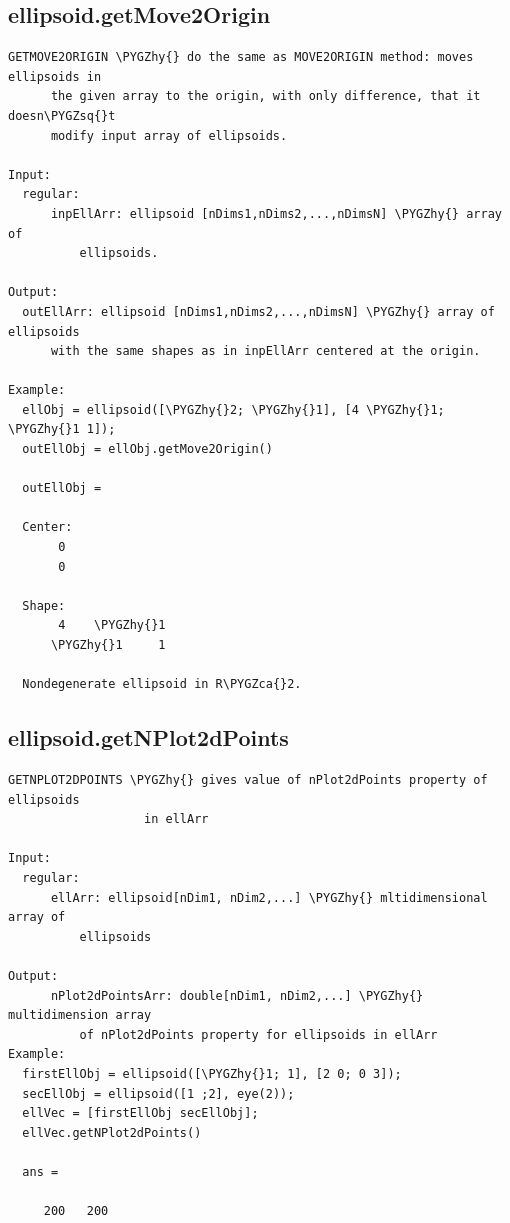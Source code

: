 \documentclass[letterpaper,10pt,english]{sphinxmanual}
\def\PYGZca{\char`\^}
\def\PYGZhy{\char`\-}
\def\PYGZsq{\char`\'}
\begin{document}
\subsection{ellipsoid.getMove2Origin}
\label{chap_functions:ellipsoid-getmove2origin}
\begin{Verbatim}[commandchars=\\\{\}]
GETMOVE2ORIGIN \PYGZhy{} do the same as MOVE2ORIGIN method: moves ellipsoids in
      the given array to the origin, with only difference, that it doesn\PYGZsq{}t
      modify input array of ellipsoids.

Input:
  regular:
      inpEllArr: ellipsoid [nDims1,nDims2,...,nDimsN] \PYGZhy{} array of
          ellipsoids.

Output:
  outEllArr: ellipsoid [nDims1,nDims2,...,nDimsN] \PYGZhy{} array of ellipsoids
      with the same shapes as in inpEllArr centered at the origin.

Example:
  ellObj = ellipsoid([\PYGZhy{}2; \PYGZhy{}1], [4 \PYGZhy{}1; \PYGZhy{}1 1]);
  outEllObj = ellObj.getMove2Origin()

  outEllObj =

  Center:
       0
       0

  Shape:
       4    \PYGZhy{}1
      \PYGZhy{}1     1

  Nondegenerate ellipsoid in R\PYGZca{}2.
\end{Verbatim}


\subsection{ellipsoid.getNPlot2dPoints}
\label{chap_functions:ellipsoid-getnplot2dpoints}
\begin{Verbatim}[commandchars=\\\{\}]
GETNPLOT2DPOINTS \PYGZhy{} gives value of nPlot2dPoints property of ellipsoids
                   in ellArr

Input:
  regular:
      ellArr: ellipsoid[nDim1, nDim2,...] \PYGZhy{} mltidimensional array of
          ellipsoids

Output:
      nPlot2dPointsArr: double[nDim1, nDim2,...] \PYGZhy{} multidimension array
          of nPlot2dPoints property for ellipsoids in ellArr
Example:
  firstEllObj = ellipsoid([\PYGZhy{}1; 1], [2 0; 0 3]);
  secEllObj = ellipsoid([1 ;2], eye(2));
  ellVec = [firstEllObj secEllObj];
  ellVec.getNPlot2dPoints()

  ans =

     200   200
\end{Verbatim}
\end{document}
